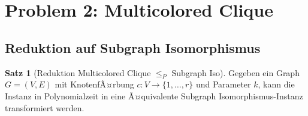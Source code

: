 ﻿\documentclass[a4paper,12pt]{article}
\theoremstyle{definition}
\newtheorem{satz}{Satz}[section]
\begin{document}
\section{Problem 2: Multicolored Clique}

\subsection{Reduktion auf Subgraph Isomorphismus}

\begin{satz}[Reduktion Multicolored Clique $\leq_P$ Subgraph Iso]
	Gegeben ein Graph $G = (V, E)$ mit KnotenfÃ¤rbung $c: V \to \{1, \ldots, r\}$ und Parameter $k$, kann die Instanz in Polynomialzeit in eine Ã¤quivalente Subgraph Isomorphismus-Instanz transformiert werden.
\end{satz}
\end{document}
